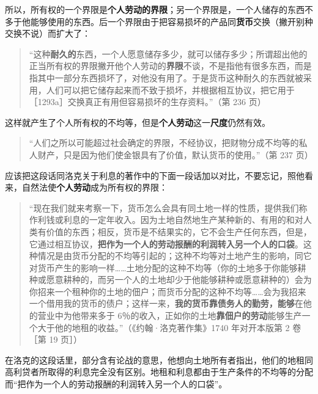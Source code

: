 所以，所有权的一个界限是\textbf{个人劳动的界限}；另一个界限是，一个人储存的东西不多于他能够使用的东西。后一个界限由于把容易损坏的产品同\textbf{货币}交换（撇开别种交换不说）而扩大了：

\begin{quote}“这种\textbf{耐久的}东西，一个人愿意储存多少，就可以储存多少；所谓超出他的正当所有权的界限\fontbox{~\{}撇开他个人劳动的\textbf{界限}不谈\fontbox{\}~}，不是指他有很多东西，而是指其中一部分东西损坏了，对他没有用了。于是货币这种耐久的东西就被采用，人们可以把它储存起来而不致于损坏，并根据相互协议，把它用于［1293a］交换真正有用但容易损坏的生存资料。”（第 236 页）\end{quote}

这样就产生了个人所有权的不均等，但是\textbf{个人劳动}这一\textbf{尺度}仍然有效。

\begin{quote}“人们之所以可能超过社会确定的界限，不经协议，把财物分成不均等的私人财产，只是因为他们使金银具有了价值，默认货币的使用。”（第 237 页）\end{quote}

应该把这段话同洛克关于利息的著作中的下面一段话加以对比，不要忘记，照他看来，自然法使\textbf{个人劳动}成为所有权的界限：

\begin{quote}“现在我们就来考察一下，货币怎么会具有同土地一样的性质，提供我们称作利钱或利息的一定年收入。因为土地自然地生产某种新的、有用的和对人类有价值的东西；相反，货币是不结果实的，它不会生产任何东西，但是，它通过相互协议，\textbf{把作为一个人的劳动报酬的利润转入另一个人的口袋}。这种情况是由货币分配的不均等引起的；这种不均等对土地产生的影响，同它对货币产生的影响一样……土地分配的这种不均等（你的土地多于你能够耕种或愿意耕种的，而另一个人的土地却少于他能够耕种或愿意耕种的）会为你招来一个租种你的土地的佃户；而货币分配的这种不均等……会为我招来一个借用我的货币的债户；这样一来，\textbf{我的货币靠债务人的勤劳，能够}在他的营业中为他带来多于 6％的收入，正如你的土地\textbf{靠佃户的劳动}能够生产一个大于他的地租的收益。”（《约翰·洛克著作集》1740 年对开本版第 2 卷［第 19 页］）\end{quote}

在洛克的这段话里，部分含有论战的意思，他想向土地所有者指出，他们的地租同高利贷者所取得的利息完全没有区别。地租和利息都由于生产条件的不均等的分配而“把作为一个人的劳动报酬的利润转入另一个人的口袋”。

